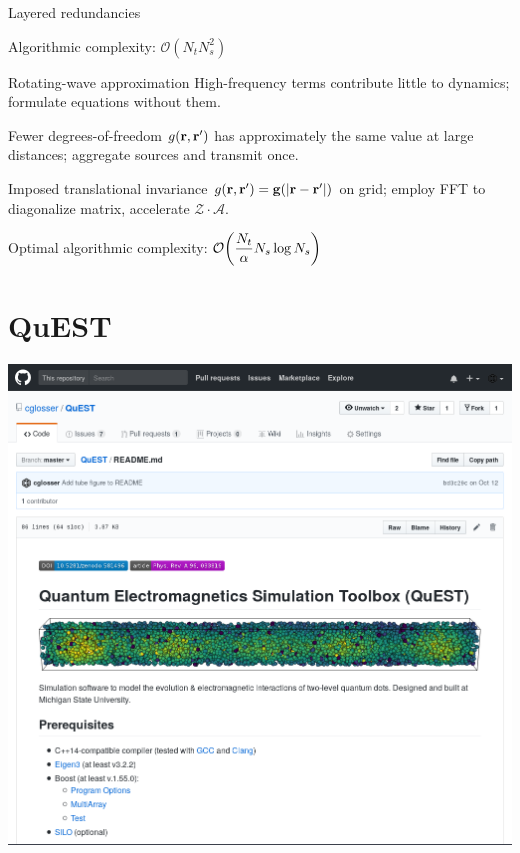 \documentclass[aspectratio=169]{beamer}
\newcommand{\oper}[1]{\mathcal{#1}}
\begin{document}
\begin{frame}{Layered redundancies}
  \begin{center}
    Algorithmic complexity: $\displaystyle\mathcal{O}(N_t N_s^2)$
  \end{center}
  \begin{block}{Rotating-wave approximation}
    High-frequency terms contribute little to dynamics; formulate equations without them.
  \end{block}
  \begin{block}{Fewer degrees-of-freedom}
    $g(\vb{r}, \vb{r}')$ has approximately the same value at large distances; aggregate sources and transmit once. 
  \end{block}
  \begin{block}{Imposed translational invariance}
    $g(\vb{r}, \vb{r}') = \vb{g}(\abs{\vb{r} - \vb{r}'})$ on grid; employ FFT to diagonalize matrix, accelerate $\oper{Z}\cdot\oper{A}$.
  \end{block}
  \begin{center}
    Optimal algorithmic complexity: $\displaystyle\mathcal{O}\qty(\frac{N_t}{\alpha} N_s \log N_s)$
  \end{center}
\end{frame}

\section{QuEST}

\begin{frame}
  \centering
  \vspace{0.5cm}
  \includegraphics[height=\textheight]{figures/github.png}
\end{frame}
\end{document}
